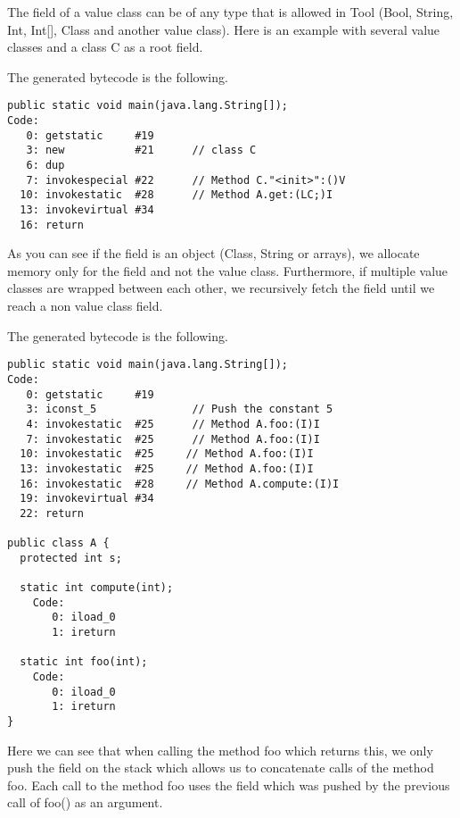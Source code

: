 The field of a value class can be of any type that is allowed in Tool (Bool, String, Int, Int[], Class and another value class). Here is an example with several value classes and a class C as a root field.



The generated bytecode is the following.

\begin{lstlisting}
public static void main(java.lang.String[]);
Code:
   0: getstatic     #19                 
   3: new           #21      // class C
   6: dup
   7: invokespecial #22      // Method C."<init>":()V
  10: invokestatic  #28      // Method A.get:(LC;)I
  13: invokevirtual #34                 
  16: return
\end{lstlisting}

As you can see if the field is an object (Class, String or arrays), we allocate memory only for the field and not the value class. \newline
Furthermore, if multiple value classes are wrapped between each other, we recursively fetch the field until we reach a non value class field.
\newpage


The generated bytecode is the following.

\begin{lstlisting}
public static void main(java.lang.String[]);
Code:
   0: getstatic     #19                 
   3: iconst_5               // Push the constant 5
   4: invokestatic  #25      // Method A.foo:(I)I
   7: invokestatic  #25      // Method A.foo:(I)I
  10: invokestatic  #25     // Method A.foo:(I)I
  13: invokestatic  #25     // Method A.foo:(I)I
  16: invokestatic  #28     // Method A.compute:(I)I
  19: invokevirtual #34                 
  22: return

public class A {
  protected int s;

  static int compute(int);
    Code:
       0: iload_0
       1: ireturn

  static int foo(int);
    Code:
       0: iload_0
       1: ireturn
}
\end{lstlisting}
Here we can see that when calling the method foo which returns this, we only push the field on the stack which allows us to concatenate calls of the method foo. Each call to the method foo uses the field which was pushed by the previous call of foo() as an argument.


